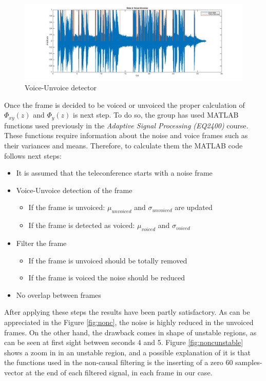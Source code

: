 \documentclass[11pt,a4paper,spanish]{book}  %
\theoremstyle{definition}  %
\theoremstyle{plain}  %
\theoremstyle{remark}  %
\begin{document}
		\begin{figure}[h]
		\centering
		\includegraphics[width=15cm]{images/theory/highsigma.jpg}
		\caption{Voice-Unvoice detector}
		\label{fig:detector}
		\end{figure}
		
		
		Once the frame is decided to be voiced or unvoiced the proper calculation of $\Phi_{xy}(z)$ and $\Phi_{y}(z)$ is next step. To do so, the group has used MATLAB functions used previously in the \textit{Adaptive Signal Processing (EQ2400)} course. These functions require information about the noise and voice frames such as their variances and means. Therefore, to calculate them the MATLAB code follows next steps:
		
		\begin{itemize}
		\item It is assumed that the teleconference starts with a noise frame
			\item Voice-Unvoice detection of the frame
		\begin{itemize}
			\item If the frame is unvoiced: $\mu_{unvoiced}$ and $\sigma_{unvoiced}$ are updated
			\item If the frame is detected as voiced: $\mu_{voiced}$ and $\sigma_{voiced}$
			\end{itemize}
			
		\item Filter the frame
			\begin{itemize}
			\item If the frame is unvoiced should be totally removed
			\item If the frame is voiced the noise should be reduced
			\end{itemize}
			\item No overlap between frames
		\end{itemize}
		
		After applying these steps the results have been partly satisfactory. As can be appreciated in the Figure \ref{fig:nonc}, the noise is highly reduced in the unvoiced frames. On the other hand, the drawback comes in shape of unstable regions, as can be seen at first sight between seconds 4 and 5. Figure \ref{fig:noncunstable} shows a zoom in in an unstable region, and a possible explanation of it is that the functions used in the non-causal filtering is the inserting of a zero 60 samples-vector at the end of each filtered signal, in each frame in our case.
		
\end{document}
